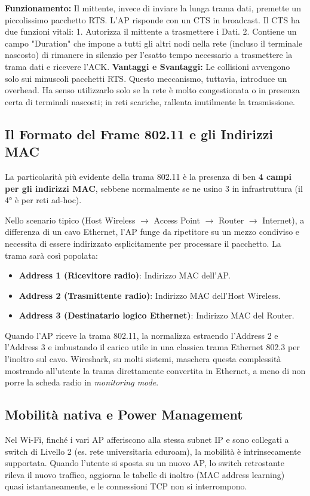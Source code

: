 \textbf{Funzionamento:} Il mittente, invece di inviare la lunga trama dati, premette un piccolissimo pacchetto RTS. L'AP risponde con un CTS in broadcast.
Il CTS ha due funzioni vitali:
1. Autorizza il mittente a trasmettere i Dati.
2. Contiene un campo "Duration" che impone a tutti gli altri nodi nella rete (incluso il terminale nascosto) di rimanere in silenzio per l'esatto tempo necessario a trasmettere la trama dati e ricevere l'ACK.
\textbf{Vantaggi e Svantaggi:} Le collisioni avvengono solo sui minuscoli pacchetti RTS. Questo meccanismo, tuttavia, introduce un overhead. Ha senso utilizzarlo solo se la rete è molto congestionata o in presenza certa di terminali nascosti; in reti scariche, rallenta inutilmente la trasmissione.

\subsection{Il Formato del Frame 802.11 e gli Indirizzi MAC}
La particolarità più evidente della trama 802.11 è la presenza di ben \textbf{4 campi per gli indirizzi MAC}, sebbene normalmente se ne usino 3 in infrastruttura (il 4° è per reti ad-hoc).

Nello scenario tipico (Host Wireless $\rightarrow$ Access Point $\rightarrow$ Router $\rightarrow$ Internet), a differenza di un cavo Ethernet, l'AP funge da ripetitore su un mezzo condiviso e necessita di essere indirizzato esplicitamente per processare il pacchetto. La trama sarà così popolata:
\begin{itemize}
    \item \textbf{Address 1 (Ricevitore radio)}: Indirizzo MAC dell'AP.
    \item \textbf{Address 2 (Trasmittente radio)}: Indirizzo MAC dell'Host Wireless.
    \item \textbf{Address 3 (Destinatario logico Ethernet)}: Indirizzo MAC del Router.
\end{itemize}
Quando l'AP riceve la trama 802.11, la normalizza estraendo l'Address 2 e l'Address 3 e imbustando il carico utile in una classica trama Ethernet 802.3 per l'inoltro sul cavo. Wireshark, su molti sistemi, maschera questa complessità mostrando all'utente la trama direttamente convertita in Ethernet, a meno di non porre la scheda radio in \textit{monitoring mode}.

\subsection{Mobilità nativa e Power Management}
Nel Wi-Fi, finché i vari AP afferiscono alla stessa subnet IP e sono collegati a switch di Livello 2 (es. rete universitaria eduroam), la mobilità è intrinsecamente supportata. Quando l'utente si sposta su un nuovo AP, lo switch retrostante rileva il nuovo traffico, aggiorna le tabelle di inoltro (MAC address learning) quasi istantaneamente, e le connessioni TCP non si interrompono.

